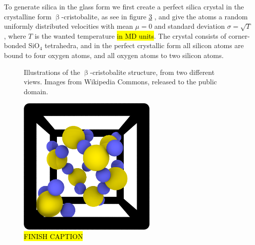 To generate silica in the glass form we first create a perfect silica crystal in the crystalline form $\upbeta$-cristobalite, as see in figure \cref{fig:cristobalite} , and give the atoms a random uniformly distributed velocities with mean $\mu = 0$ and standard deviation $\sigma = \sqrt{T}$, where $T$ is the wanted temperature \hl{in MD units}. The crystal consists of corner-bonded SiO$_4$ tetrahedra, and in the perfect crystallic form all silicon atoms are bound to four oxygen atoms, and all oxygen atoms to two silicon atoms.
%
\begin{figure}[htpb]%
    \centering%
    \begin{subfigure}[c]{0.25\textwidth}%
        \caption{}%
        \label{fig:cristobalite01}%
    \end{subfigure}%
    \hspace{0.07\textwidth}%
    \begin{subfigure}[c]{0.45\textwidth}%
    \caption{}%
    \label{fig:cristobalite02}%
    \end{subfigure}%
    \caption{%
        Illustrations of the $\upbeta$-cristobalite structure, from two different views. Images from Wikipedia Commons, released to the public domain\cite{wikiCristobalite01,wikiCristobalite02}.%
        \label{fig:cristobalite}%
    }%
\end{figure}%
%
\begin{figure}[htpb]%
    \centering%
    \includegraphics[width=0.6\textwidth]{images/beta_cristobalite/unit_cell03_cropped.png}%
    \caption{
        \hl{FINISH CAPTION}%
    }%
    \label{fig:beta_cristobalite-unit_cell}%
\end{figure}%

